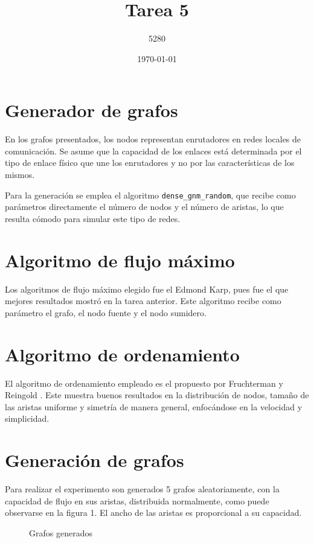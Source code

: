 \documentclass{article}
\title{
Tarea 5
}
\author{5280}
\date{\today}
\begin{document}
\maketitle

\section*{Generador de grafos} 

En los grafos presentados, los nodos representan enrutadores en redes locales de comunicación. Se asume que la capacidad de los enlaces está determinada por el tipo de enlace físico que une los  enrutadores y no por las características de los mismos. 

Para la generación se emplea el algoritmo \texttt{dense\_gnm\_random}, que recibe como parámetros directamente el número de nodos y el número de aristas, lo que resulta cómodo para simular este tipo de redes.

\section*{Algoritmo de flujo máximo}

Los algoritmos de flujo máximo elegido fue el Edmond Karp, pues fue el que mejores resultados mostró en la tarea anterior. Este algoritmo recibe como parámetro el grafo, el nodo fuente y el nodo sumidero.

\section*{Algoritmo de ordenamiento}

El algoritmo de ordenamiento empleado es el propuesto por Fruchterman y Reingold \citep{fruchterman1991graph}. Este muestra buenos resultados en la distribución de nodos, tamaño de las aristas uniforme y simetría de manera general, enfocándose en la velocidad y simplicidad.

\section*{Generación de grafos}

Para realizar el experimento son generados 5 grafos aleatoriamente, con la capacidad de flujo en sus aristas, distribuida normalmente, como puede observarse en la figura 1. El ancho de las aristas es proporcional a su capacidad. 

\begin{figure}[htbp]
\centering
{}
\caption{Grafos generados}
\label{Grafos} 
\end{figure}
\end{document}
